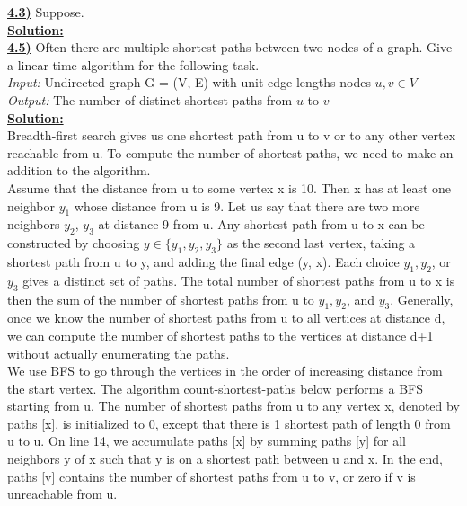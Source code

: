 \documentclass{article}
\begin{document}
\vspace{.2in}
\noindent \textbf{\underline{4.3)}} Suppose.\\

\noindent \textbf{\underline{Solution:}}  \\


\vspace{.2in}
\noindent \textbf{\underline{4.5)}} Often there are multiple shortest paths between two nodes of a graph. Give a linear-time algorithm for the following task. \\

\indent \textit{Input:} Undirected graph G = (V, E) with unit edge lengths nodes $u, v \in V$ \\
\indent \textit{Output:} The number of distinct shortest paths from $u$ to $v$ \\

\noindent \textbf{\underline{Solution:}}  \\
\indent Breadth-first search gives us one shortest path from u to v or to any other vertex reachable from u. To compute the number of shortest paths, we need to make an addition to the algorithm. \\
Assume that the distance from u to some vertex x is 10.  Then x has at least one neighbor $y_1$ whose distance from u is 9.  Let us say that there are two more neighbors $y_2$, $y_3$ at distance 9 from u. Any shortest path from u to x can be constructed by choosing $y \in \{y_1, y_2, y_3\}$ as the second last vertex, taking a shortest path from u to y, and adding the final edge (y, x). Each choice $y_1, y_2$, or $y_3$ gives a distinct set of paths. The total number of shortest paths from u to x is then the sum of the number of shortest paths from u to $y_1, y_2$, and $y_3$. Generally, once we know the number of shortest paths from u to all vertices at distance d, we can compute the number of shortest paths to the vertices at distance d+1 without actually enumerating the paths. \\

We use BFS to go through the vertices in the order of increasing distance from the start vertex. The algorithm  count-shortest-paths below performs a BFS starting from u. The number of shortest paths from u to any vertex x, denoted by paths [x], is initialized to 0, except that there is 1 shortest path of length 0 from u to u. On line 14, we accumulate paths [x] by summing paths [y] for all neighbors y of x such that y is on a shortest path between u and x. In the end, paths [v] contains the number of shortest paths from u to v, or zero if v is unreachable from u. \\
\end{document}
